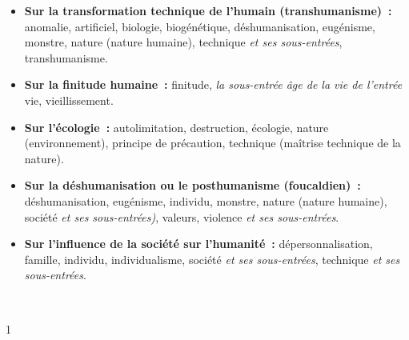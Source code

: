 \begin{itemize}\setlength{\itemsep}{6pt}

\item \textbf{Sur la transformation technique de l'humain (transhumanisme)~:} anomalie, artificiel, biologie, biogénétique, déshumanisation, eugénisme, monstre, nature (nature humaine), technique \textit{et ses sous-entrées}, transhumanisme.

\item \textbf{Sur la finitude humaine~:} finitude, \textit{la sous-entrée \emph{âge de la vie} de l'entrée} vie, vieillissement.

\item \textbf{Sur l'écologie~:} autolimitation, destruction, écologie, nature (environnement), principe de précaution, technique (maîtrise technique de la nature).

\item \textbf{Sur la déshumanisation ou le posthumanisme (foucaldien)~:} déshumanisation, eugénisme, individu, monstre, nature (nature humaine), société \textit{et ses sous-entrées)}, valeurs, violence \textit{et ses sous-entrées}.

\item \textbf{Sur l'influence de la société sur l'humanité~:}
dépersonnalisation, famille, individu, individualisme, société \textit{et ses sous-entrées}, technique \textit{et ses sous-entrées}.

\end{itemize}

\vfill{~}

\clearpage
\pagestyle{plain}
\cleardoublepage
\pagestyle{index}

\begin{spacing}{1}
\hypertarget{indexn}{}
%
\printindex[n]
\end{spacing}